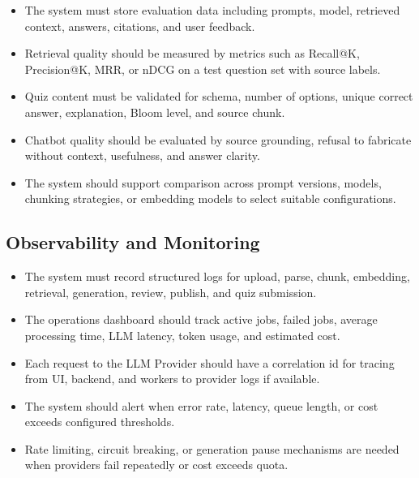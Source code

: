 \begin{itemize}
    \item The system must store evaluation data including prompts, model,
          retrieved context, answers, citations, and user feedback.
    \item Retrieval quality should be measured by metrics such as Recall@K,
          Precision@K, MRR, or nDCG on a test question set with source labels.
    \item Quiz content must be validated for schema, number of options, unique
          correct answer, explanation, Bloom level, and source chunk.
    \item Chatbot quality should be evaluated by source grounding, refusal to
          fabricate without context, usefulness, and answer clarity.
    \item The system should support comparison across prompt versions, models,
          chunking strategies, or embedding models to select suitable
          configurations.
\end{itemize}

\subsection{Observability and Monitoring}
\label{subsec:observability-monitoring}

\begin{itemize}
    \item The system must record structured logs for upload, parse, chunk,
          embedding, retrieval, generation, review, publish, and quiz
          submission.
    \item The operations dashboard should track active jobs, failed jobs,
          average processing time, LLM latency, token usage, and estimated
          cost.
    \item Each request to the LLM Provider should have a correlation id for
          tracing from UI, backend, and workers to provider logs if available.
    \item The system should alert when error rate, latency, queue length, or
          cost exceeds configured thresholds.
    \item Rate limiting, circuit breaking, or generation pause mechanisms are
          needed when providers fail repeatedly or cost exceeds quota.
\end{itemize}
